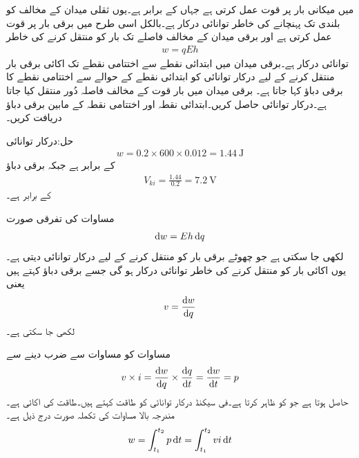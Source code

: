  میں میکانی بار  پر قوت  عمل کرتی ہے جہاں  کے برابر ہے۔یوں ثقلی میدان کے مخالف  کو  بلندی تک پہنچانے کی خاطر  توانائی درکار ہے۔بالکل اسی طرح   میں برقی بار  پر  قوت عمل کرتی ہے اور برقی میدان کے مخالف  فاصلے تک بار کو منتقل کرنے کی خاطر 
\begin{align}\label{مساوات_بنیادی_توانائی_دباو}
w=q E h
\end{align}
توانائی درکار ہے۔برقی میدان میں ابتدائی نقطے سے اختتامی نقطے تک اکائی برقی بار منتقل کرنے کے لیے درکار توانائی کو ابتدائی نقطے کے حوالے سے اختتامی نقطے کا برقی دباؤ کہا جاتا ہے۔
برقی میدان  میں  بار قوت کے مخالف  فاصلہ دُور منتقل کیا جاتا ہے۔درکار توانائی حاصل کریں۔ابتدائی نقطہ  اور اختتامی نقطہ  کے مابین برقی دباؤ دریافت کریں۔

حل:درکار توانائی
\begin{align*}
w=0.2 \times 600 \times 0.012=\SI{1.44}{\joule}
\end{align*}
کے برابر ہے جبکہ برقی دباؤ
\begin{align*}
V_{ki}=\frac{1.44}{0.2}=\SI{7.2}{\volt}
\end{align*}
کے برابر ہے۔

مساوات  کی تفرقی صورت 
\begin{align*}
\dif w= E h \dif q
\end{align*}
لکھی جا سکتی ہے جو چھوٹے برقی بار  کو منتقل کرنے کے لیے درکار توانائی  دیتی ہے۔یوں اکائی بار کو منتقل کرنے کی خاطر  توانائی درکار ہو گی جسے برقی دباؤ  کہتے ہیں یعنی
\begin{align}\label{مساوات_بنیادی_دباو_تعریف}
v=\frac{\dif w}{\dif q}
\end{align}
لکھی جا سکتی ہے۔

مساوات  کو مساوات  سے ضرب دینے سے
\begin{align}\label{مساوات_بنیادی_طاقت_مساوی_دباو_ضرب_رو}
v \times i = \frac{\dif w}{\dif q} \times \frac{\dif q}{\dif t}=\frac{\dif w}{\dif t}=p
\end{align}
حاصل ہوتا ہے جو   کو ظاہر کرتا ہے۔فی سیکنڈ درکار توانائی کو طاقت کہتے ہیں۔طاقت کی اکائی   ہے۔مندرجہ بالا مساوات کی تکملہ صورت درج ذیل ہے۔
\begin{align}
w=\int_{t_1}^{t_2} p \dif t=\int_{t_1}^{t_2} v i\dif t
\end{align}


